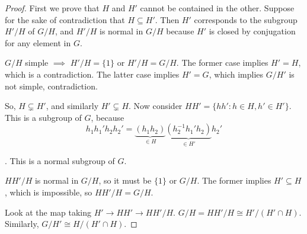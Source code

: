 \begin{proof}
First we prove that $H$ and $H'$ cannot be contained in the other. Suppose for the sake of contradiction that $H\subseteq H'$. Then $H'$ corresponds to the subgroup $H'/H$ of $G/H$, and $H'/H$ is normal in $G/H$ because $H'$ is closed by conjugation for any element in $G$.

$G/H$ simple $\implies$ $H'/H = \{1\}$ or $H'/H = G/H$. The former case implies $H'=H$, which is a contradiction. The latter case implies $H'=G$, which implies $G/H'$ is not simple, contradiction. 

So, $H\subsetneq H'$, and similarly $H'\subsetneq H$. Now consider $HH' = \{hh' : h\in H, h'\in H'\}$. This is a subgroup of $G$, because 
\[h_1h_1'h_2h_2' = \underbrace{(h_1h_2)}_{\in H}\underbrace{(h_2^{-1}h_1'h_2)}_{\in H'}h_2'\]

. This is a normal subgroup of $G$.

$HH'/H$ is normal in $G/H$, so it must be $\{1\}$ or $G/H$. The former implies $H'\subseteq H$, which is impossible, so $HH'/H=G/H$.

Look at the map taking $H' \rightarrow HH' \rightarrow HH'/H$.
$G/H = HH'/H \cong H'/(H'\cap H)$. Similarly, $G/H'\cong H/(H'\cap H)$.
\end{proof}

